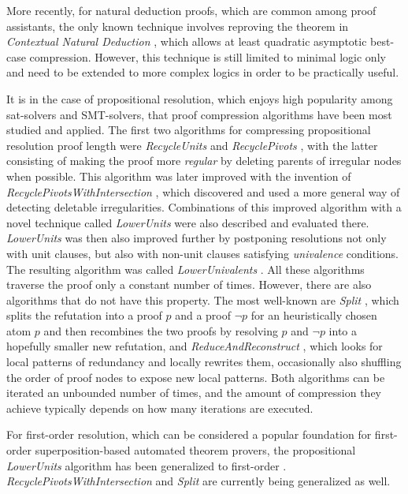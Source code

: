 More recently, for natural deduction proofs, which are common among proof assistants, the only known technique involves reproving the theorem in \emph{Contextual Natural Deduction} \cite{BrunoLFCS2013ContextualNaturalDeduction,BrunoCSRContextualNDEvaluation}, which allows at least quadratic asymptotic best-case compression. However, this technique is still limited to minimal logic only and need to be extended to more complex logics in order to be practically useful.

It is in the case of propositional resolution, which enjoys high popularity among sat-solvers and SMT-solvers, that proof compression algorithms have been most studied and applied. The first two algorithms for compressing propositional resolution proof length were \emph{RecycleUnits} and \emph{RecyclePivots} \cite{Bar-IlanFuhrmannHooryShachamStrichman2009Linear-time-reductions-of-resolution-proofs}, with the latter consisting of making the proof more \emph{regular} by deleting parents of irregular nodes when possible. This algorithm was later improved with the invention of \emph{RecyclePivotsWithIntersection} \cite{Bruno-Pascal-StephanMerz-RPI}, which discovered and used a more general way of detecting deletable irregularities. Combinations of this improved algorithm with a novel technique called \emph{LowerUnits} \cite{Bruno-Pascal-StephanMerz-RPI} were also described and evaluated there. \emph{LowerUnits} was then also improved further by postponing resolutions not only with unit clauses, but also with non-unit clauses satisfying \emph{univalence} conditions. The resulting algorithm was called \emph{LowerUnivalents} \cite{DBLP:conf/tableaux/BoudouP13}. All these algorithms traverse the proof only a constant number of times. However, there are also algorithms that do not have this property. The most well-known are \emph{Split} \cite{cotton2010two}, which splits the refutation into a proof $p$ and a proof $\neg p$ for an heuristically chosen atom $p$ and then recombines the two proofs by resolving $p$ and $\neg p$ into a hopefully smaller new refutation, and \emph{ReduceAndReconstruct} \cite{SimoneBrutomessoSarygina2010An-Efficient-and-Flexible-Approach-to-Resolution-Proof-Reduction}, which looks for local patterns of redundancy and locally rewrites them, occasionally also shuffling the order of proof nodes to expose new local patterns. Both algorithms can be iterated an unbounded number of times, and the amount of compression they achieve typically depends on how many iterations are executed.

For first-order resolution, which can be considered a popular foundation for first-order superposition-based automated theorem provers, the propositional \emph{LowerUnits} algorithm has been generalized to first-order \cite{DBLP:conf/cade/GorznyP15}. \emph{RecyclePivotsWithIntersection} and \emph{Split} are currently being generalized as well.

